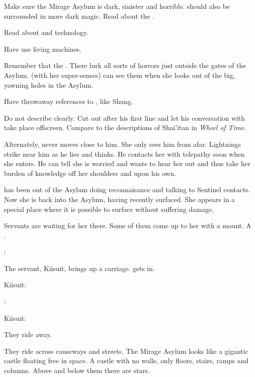 

Make sure the Mirage Asylum is dark, sinister and horrible. 
\Criseis should also be surrounded in more dark magic.
Read about the . 

Read about \dragons and technology. 

Have \Criseis use {living machines}. 
    
Remember that the .
There lurk all sorts of horrors just outside the gates of the Asylum.
\Criseis (with her super-senses) can see them when she looks out of the big, yawning holes in the Asylum. 

Have throwaway references to , like Shung. 

Do not describe \Ishnaruchaefir clearly.
Cut out after his first line and let his conversation with \Criseis take place offscreen.
Compare to the descriptions of Shai'itan in \emph{Wheel of Time}. 

Alternately, \Criseis never moves close to him.
She only sees him from afar.
Lightnings strike near him as he lies and thinks.
He contacts her with telepathy soon when she enters.
He can tell she is worried and wants to hear her out and thus take her burden of knowledge off her shoulders and upon his own.

\Criseis has been out of the Asylum doing reconnaisance and talking to Sentinel contacts.
Now she is back into the Asylum, having recently surfaced. 
She appears in a special  place where it is possible to surface without suffering damage. 

Servants are waiting for her there. 
Some of them come up to her with a mount. 
A \relc. 

\Criseis: 

The \scatha servant, Kiisuit, brings up a carriage. 
\Criseis gets in. 

Kiisuit: 

\Criseis: 

Kiisuit: 

They ride away. 

They ride across causeways and streets. 
The Mirage Asylum looks like a gigantic castle floating free in space. 
A castle with no walls, only floors, stairs, ramps and columns. 
Above and below them there are stars. 


